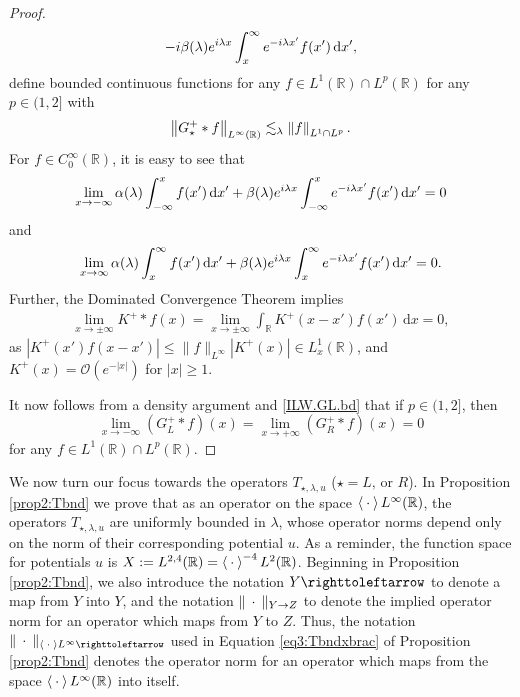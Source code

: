 \documentclass[../dissertation]{subfiles}
\begin{document}
\begin{proof}
\begin{align}
				- i \beta(\lambda) e^{i\lambda x} 
						\int_x^{\infty} e^{-i\lambda x'} f(x') \, \mathrm{d}x', 
				\nonumber
	\end{align}
	define bounded continuous functions for any 
	$f \in L^1(\mathbb R) \cap L^p(\mathbb R)$ for any $p \in (1,2]$ with
	\begin{equation}
		\label{ILW.GL.bd}
		\norm[L^\infty(\mathbb R)]{G_\star^+*f} \lesssim_\lambda \norm[L^1 \cap L^p]{f}.
	\end{equation}
	For $f \in C_0^\infty(\mathbb R)$, it is easy to see that
	\begin{align*}
		\lim_{x\to-\infty} \alpha (\lambda) \int_{-\infty}^x f(x') \, \mathrm{d}x' 
				+ \beta(\lambda) e^{i\lambda x} 
						\int_{-\infty}^x e^{-i\lambda x'} f(x') \, \mathrm{d}x'
				= 0
	\end{align*}
	and 
	\begin{align*}
		\lim_{x\to\infty}
				\alpha (\lambda) \int_x^{\infty} f(x') \, \mathrm{d}x' 
				+  \beta(\lambda) e^{i\lambda x} 
						\int_x^{\infty} e^{-i\lambda x'} f(x') \, \mathrm{d}x'
			= 0.
	\end{align*}
	Further, the Dominated Convergence Theorem implies 
	\begin{align*}
		\lim_{x\to \pm \infty} K^+*f(x) 
			= \lim_{x\to \pm \infty} \int_{\mathbb R} K^+(x-x') f(x') \, \mathrm{d}x
			= 0,
	\end{align*}
	as $|K^+(x') f(x-x')| \leq \|f\|_{L^\infty} |K^+(x)| \in L_x^1(\mathbb R)$,
	and $K^+(x) = \mathcal O\left(e^{-|x|}\right)$ for $|x| \geq 1$. 



	It now follows from a density 
	argument and \eqref{ILW.GL.bd} that if $p \in (1,2]$, then
	\begin{equation}
		\label{ILW.GL.vanish}
		\lim_{x \to -\infty} \left(G_L^+*f\right)(x) 
			= \lim_{x \to +\infty} \left(G_R^+*f\right)(x) 
			= 0
	\end{equation}
	for any $f \in L^1(\mathbb R) \cap L^p(\mathbb R)$.
\end{proof}

We now turn our focus towards the operators $T_{\star, \lambda, u}$
($\star = L \text{, or } R$). In Proposition \ref{prop2:Tbnd} we prove that as 
an operator on the space $\left\langle \kern 0.5ex \cdot \kern 0.5ex \right\rangle L^\infty(\mathbb R)$, the operators 
$T_{\star, \lambda, u}$ are uniformly bounded in $\lambda$, whose operator norms 
depend only on the norm of their corresponding potential $u$. As a reminder, the 
function space for potentials $u$ is 
$X:=L^{2, 4}(\mathbb R) = \left\langle \kern 0.5ex \cdot \kern 0.5ex \right\rangle^{-4} L^2(\mathbb R)$. Beginning in
Proposition \ref{prop2:Tbnd}, we also introduce the notation 
$Y\toitself$\label{sym:toitself} to
denote a map from $Y$ into $Y$, and the notation 
$\|\kern 0.5ex \cdot \kern 0.5ex\|_{Y\to Z}$\label{sym:opnorm} to
denote the implied operator norm for an operator which maps from $Y$ to $Z$.
Thus, the notation $\|\dotarg\|_{\inn{\dotarg}L^\infty\toitself}$ used in 
Equation \eqref{eq3:Tbndxbrac} of Proposition \ref{prop2:Tbnd} denotes the 
operator norm for an operator which maps from the space 
$\left\langle \kern 0.5ex \cdot \kern 0.5ex \right\rangle L^\infty(\mathbb R)$ into itself.
\end{document}
